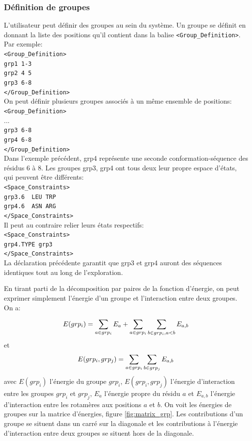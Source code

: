 \subsubsection{Définition de groupes}
\label{sub:group}
L'utilisateur peut définir des groupes au sein du système. Un groupe se définit en donnant la liste des positions qu'il contient dans la balise \verb!<Group_Definition>!. Par exemple:\\
\verb!<Group_Definition>! \\
\verb!grp1 1-3! \\
\verb!grp2 4 5! \\
\verb!grp3 6-8! \\
\verb!</Group_Definition>! \\
On peut définir plusieurs groupes associés à un même ensemble de positions:\\
\verb!<Group_Definition>! \\
... \\
\verb!grp3 6-8! \\
\verb!grp4 6-8! \\
\verb!</Group_Definition>! \\
Dans l'exemple précédent, grp4 représente une seconde conformation-séquence des résidus 6 à 8. Les groupes grp3, grp4 ont tous deux leur propre espace d'états, qui peuvent être différents:\\
\verb!<Space_Constraints>! \\
\verb!grp3.6  LEU TRP! \\
\verb!grp4.6  ASN ARG!  \\
\verb!</Space_Constraints>! \\
Il peut au contraire relier leurs états respectifs:\\
\verb!<Space_Constraints>! \\
\verb!grp4.TYPE grp3! \\
\verb!</Space_Constraints>! \\
La déclaration précédente garantit que grp3 et grp4 auront des séquences identiques tout au long de l'exploration.

En tirant parti de la décomposition par paires de la fonction d'énergie, on peut exprimer simplement l'énergie d'un groupe et l'interaction entre deux groupes. On a:

\begin{equation}
E(grp_i) = \sum_{a \in grp_i}E_a + \sum_{a\in grp_i} \sum_{b\in grp_i, a < b}E_{a,b} \\
\end{equation}
et
\begin{equation}
E(grp_i,grp_j) = \sum_{a \in grp_i} \sum_{b \in grp_j} E_{a,b} \\
\end{equation}
avec $E(grp_i)$ l'énergie du groupe $grp_i$, $E(grp_i,grp_j)$ l'énergie d'interaction entre les groupes $grp_i$ et $grp_j$, $E_a$ l'énergie propre du résidu $a$ et $E_{a,b}$ l'énergie d'interaction entre les rotamères aux positions $a$ et $b$. On voit les énergies de groupes sur la matrice d'énergies, figure \ref{fig:matrix_grp}. Les contributions d'un groupe se situent dans un carré sur la diagonale et les contributions à l'énergie d'interaction entre deux groupes se situent hors de la diagonale.


